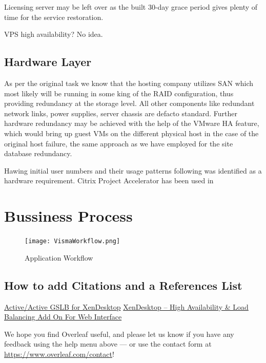 \documentclass[a4paper]{article}
\begin{document}
	Licensing server may be left over as the built 30-day grace period gives plenty of time for the service restoration.
	
	VPS high availability? No idea.         
	
	\subsection{Hardware Layer}
	
	As per the original task we know that the hosting company utilizes SAN which most likely will be running in some king of the RAID configuration, thus providing redundancy at the storage level. All other components like redundant network links, power supplies, server chassis are defacto standard. Further hardware redundancy may be achieved with the help of the VMware HA feature, which would bring up guest VMs on the different physical host in the case of the original host failure, the same approach as we have employed for the site database redundancy.
	
	Hawing initial user numbers and their usage patterns following was identified as a hardware requirement. Citrix Project Accelerator has been used in  
	
	\section{Bussiness Process}
	
	\begin{figure}
		\centering
		\texttt{[image: VismaWorkflow.png]}
		\caption{\label{fig:VismaWorkflow}Application Workflow}
	\end{figure}
	
	\subsection{How to add Citations and a References List}
	\href{https://www.citrix.com/blogs/2014/04/09/activeactive-gslb-for-xendesktop-a-practical-approach-part-1/}{Active/Active GSLB for XenDesktop}
	\href{https://www.citrix.com/blogs/2012/11/24/xendesktop-high-availability-load-balancing-add-on-for-web-interface/}{XenDesktop – High Availability \& Load Balancing Add On For Web Interface}

	
	We hope you find Overleaf useful, and please let us know if you have any feedback using the help menu above --- or use the contact form at \url{https://www.overleaf.com/contact}!
	
	
	
	
\end{document}

